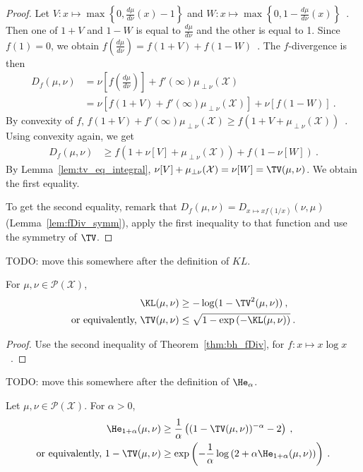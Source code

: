 \begin{proof}\leanok
{}
Let $V: x \mapsto \max\left\{0, \frac{d\mu}{d\nu}(x) - 1\right\}$ and $W: x \mapsto \max\left\{0, 1 - \frac{d\mu}{d\nu}(x)\right\}$~.
Then one of $1+V$ and $1-W$ is equal to $\frac{d\mu}{d\nu}$ and the other is equal to 1.
Since $f(1) = 0$, we obtain $f(\frac{d\mu}{d\nu}) = f(1+V) + f(1-W)$~.
The $f$-divergence is then
\begin{align*}
D_f(\mu, \nu)
&= \nu[f(\frac{d\mu}{d\nu})] + f'(\infty)\mu_{\perp \nu}(\mathcal X)
\\
&= \nu\left[f(1+V) + f'(\infty)\mu_{\perp \nu}(\mathcal X)\right] + \nu\left[f(1 - W)\right]
\: .
\end{align*}
By convexity of $f$, $f(1+V) + f'(\infty)\mu_{\perp \nu}(\mathcal X) \ge f(1+V + \mu_{\perp \nu}(\mathcal X))$~. Using convexity again, we get
\begin{align*}
D_f(\mu, \nu)
&\ge f(1+ \nu[V] + \mu_{\perp \nu}(\mathcal X)) + f(1 - \nu[W])
\: .
\end{align*}
By Lemma~\ref{lem:tv_eq_integral}, $\nu[V] + \mu_{\perp \nu}(\mathcal X) = \nu[W] = \TV(\mu, \nu)$. We obtain the first equality.

To get the second equality, remark that $D_f(\mu, \nu) = D_{x\mapsto xf(1/x)}(\nu, \mu)$ (Lemma~\ref{lem:fDiv_symm}), apply the first inequality to that function and use the symmetry of $\TV$.
\end{proof}

\begin{corollary}
  \label{cor:bh_kl}
  \leanok
  TODO: move this somewhere after the definition of $KL$.

  For $\mu, \nu \in \mathcal P(\mathcal X)$,
  \begin{align*}
  \KL(\mu, \nu)
  &\ge - \log(1 - \TV^2(\mu, \nu))
  \: , \\
  \text{or equivalently, }
  \TV(\mu, \nu)
  &\le \sqrt{1 - \exp\left(-\KL(\mu, \nu) \right)}
  \: .
  \end{align*}
\end{corollary}

\begin{proof}\leanok
{}
Use the second inequality of Theorem~\ref{thm:bh_fDiv}, for $f: x \mapsto x \log x$~.
\end{proof}

\begin{corollary}
  \label{cor:cor:bh_hellingerAlpha}
  TODO: move this somewhere after the definition of $\He_\alpha$.

  Let $\mu, \nu \in \mathcal P(\mathcal X)$. For $\alpha > 0$,
  \begin{align*}
  \He_{1+\alpha}(\mu, \nu)
  &\ge \frac{1}{\alpha} \left( (1 - \TV(\mu, \nu))^{-\alpha} - 2 \right)
  \: , \\
  \text{or equivalently, }
  1 - \TV(\mu, \nu)
  &\ge \exp\left(-\frac{1}{\alpha} \log \left( 2 + \alpha \He_{1+\alpha}(\mu, \nu) \right)\right)
  \: .
  \end{align*}
\end{corollary}

